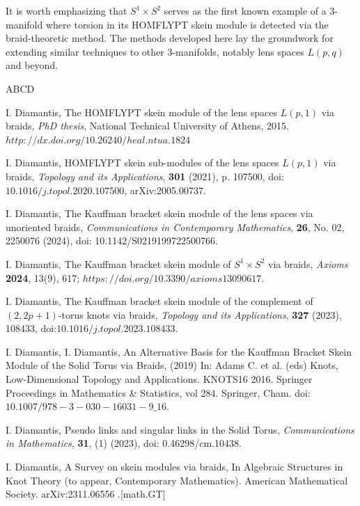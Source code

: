 \documentclass[11pt]{amsart}
\begin{document}
It is worth emphasizing that \(S^1 \times S^2\) serves as the first known example of a 3-manifold where torsion in its HOMFLYPT skein module is detected via the braid-theoretic method. The methods developed here lay the groundwork for extending similar techniques to other 3-manifolds, notably lens spaces \(L(p, q)\) and beyond.



\begin{thebibliography}{ABCD}


 {\sc I. Diamantis}, The HOMFLYPT skein module of the lens spaces $L(p,1)$ via braids, {\em PhD thesis},
National Technical University of Athens, 2015. $http://dx.doi.org/10.26240/heal.ntua.1824$

 {\sc I. Diamantis}, HOMFLYPT skein sub-modules of the lens spaces $L(p,1)$ via braids, {\em Topology and its Applications}, {\bf301} (2021), p. 107500, doi:$10.1016/j.topol.2020.107500$, arXiv:2005.00737.

 {\sc I. Diamantis}, The Kauffman bracket skein module of the lens spaces via unoriented braids, {\em Communications in Contemporary Mathematics}, 
{\bf 26}, No. 02, 2250076 (2024), doi: 10.1142/S0219199722500766.

 {\sc I. Diamantis},
The Kauffman bracket skein module of $S^1 \times S^2$ via braids, {\it Axioms} {\bf 2024}, 13(9), 617; $https://doi.org/10.3390/axioms13090617$.

 {\sc I. Diamantis}, The Kauffman bracket skein module of the complement of $(2,2p+1)$-torus knots via braids, {\em Topology and its Applications}, {\bf 327} (2023), 108433, doi:$10.1016/j.topol.2023.108433$.

 {\sc I. Diamantis}, {\sc I. Diamantis}, An Alternative Basis for the Kauffman Bracket Skein Module of the Solid Torus via Braids, (2019) In: Adams C. et al. (eds) Knots, Low-Dimensional Topology and Applications. KNOTS16 2016. Springer Proceedings in Mathematics \& Statistics, vol 284. Springer, Cham. doi:$10.1007/978-3-030-16031-9\_16$.

 {\sc I. Diamantis}, Pseudo links and singular links in the Solid Torus, {\it Communications in Mathematics}, {\bf 31}, (1) (2023), doi: 0.46298/cm.10438.


 {\sc I. Diamantis}, A Survey on skein modules via braids, In Algebraic Structures in Knot Theory (to appear, Contemporary Mathematics). American Mathematical Society. arXiv:2311.06556 .[math.GT]


\end{thebibliography}
\end{document}
